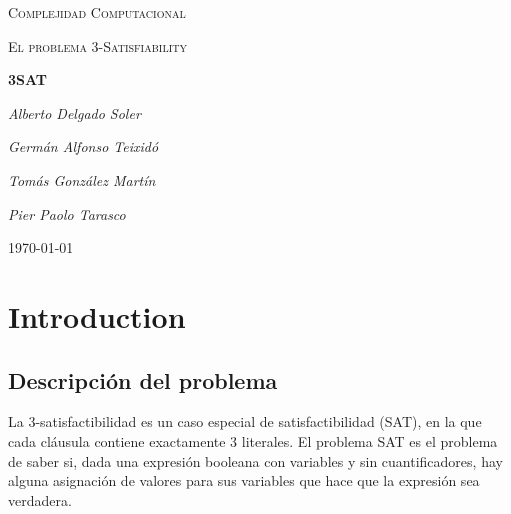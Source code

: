 \documentclass{article}
\begin{document}
\begin{titlepage}
	\centering
	{\scshape\LARGE Complejidad Computacional\par}
	\vspace{1cm}
	{\scshape\Large El problema 3-Satisfiability\par}
	\vspace{1.5cm}
	{\huge\bfseries 3SAT\par}
	\vspace{2cm}
	{\Large\itshape Alberto Delgado Soler\par}
	{\Large\itshape Germán Alfonso Teixidó\par}
	{\Large\itshape Tomás González Martín\par}
	{\Large\itshape Pier Paolo Tarasco\par}
	  
	 \vfill

	{\large \today\par}
\end{titlepage}


\section{Introduction}
\subsection{Descripción del problema}
La 3-satisfactibilidad es un caso especial de satisfactibilidad (SAT), en la que cada cláusula contiene exactamente 3 literales. El problema SAT es el problema de saber si, dada una expresión booleana con variables y sin cuantificadores, hay alguna asignación de valores para sus variables que hace que la expresión sea verdadera.
\end{document}
